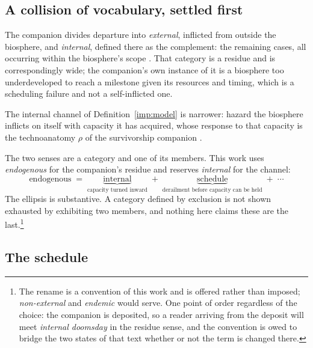 \subsection{A collision of vocabulary, settled first}
\label{sch:subsub:vocab}

\begin{convention}\label{sch:conv:internal}
The companion divides departure into \emph{external}, inflicted from
outside the biosphere, and \emph{internal}, defined there as the
complement: the remaining cases, all occurring within the biosphere's
scope \cite{Nexus}. That category is a residue and is correspondingly
wide; the companion's own instance of it is a biosphere too
underdeveloped to reach a milestone given its resources and timing,
which is a scheduling failure and not a self-inflicted one.

The internal channel of Definition~\ref{imp:model} is narrower: hazard the
biosphere inflicts on itself with capacity it has acquired, whose
response to that capacity is the technoanatomy $\rho$ of
the survivorship companion \cite{GoldenSurvivorship}.

The two senses are a category and one of its members. This work uses
\emph{endogenous} for the companion's residue and reserves
\emph{internal} for the channel:
\begin{equation}\label{sch:eq:partition}
\text{endogenous}\;=\;\underbrace{\text{internal}}_{\text{capacity
turned inward}}\;+\;\underbrace{\text{schedule}}_{\text{derailment
before capacity can be held}}\;+\;\cdots
\end{equation}
The ellipsis is substantive. A category defined by exclusion is not
shown exhausted by exhibiting two members, and nothing here claims these
are the last.\footnote{The rename is a convention of this work and is
offered rather than imposed; \emph{non-external} and \emph{endemic}
would serve. One point of order regardless of the choice: the companion
is deposited, so a reader arriving from the deposit will meet
\emph{internal doomsday} in the residue sense, and the convention is
owed to bridge the two states of that text whether or not the term is
changed there.}
\end{convention}

\subsection{The schedule}\label{sch:subsub:model}

